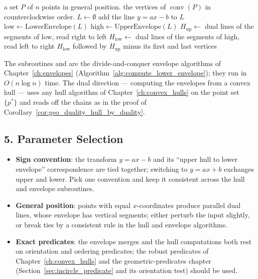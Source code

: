 \begin{algorithm}[htbp]
\caption{Convex Hull via Dual Envelopes}
\label{alg:geo_duality_hull_by_envelopes}
\begin{algorithmic}[1]
\Require a set $P$ of $n$ points in general position.
\Ensure the vertices of $\operatorname{conv}(P)$ in counterclockwise order.
  \State $L \gets \emptyset$
    \State add the line $y = ax - b$ to $L$ 
  \EndFor
  \State $\text{low} \gets \text{LowerEnvelope}(L)$ 
  \State $\text{high} \gets \text{UpperEnvelope}(L)$ 
  \State $H_{\text{up}} \gets $ dual lines of the segments of $\text{low}$,
         read right to left 
  \State $H_{\text{low}} \gets $ dual lines of the segments of $\text{high}$,
         read left to right 
  \State \Return $H_{\text{low}}$ followed by $H_{\text{up}}$ minus its
         first and last vertices
\EndFunction
\end{algorithmic}
\end{algorithm}

The subroutines  and  are the
divide-and-conquer envelope algorithms of Chapter~\ref{ch:envelopes}
(Algorithm~\ref{alg:compute_lower_envelope}); they run in $O(n \log n)$
time. The dual direction --- computing the envelopes from a convex hull ---
uses any hull algorithm of Chapter~\ref{ch:convex_hulls} on the point set
$\{p^*\}$ and reads off the chains as in the proof of
Corollary~\ref{cor:geo_duality_hull_by_duality}.

\subsection{5. Parameter Selection}

\begin{itemize}
\item \textbf{Sign convention}: the transform $y = ax - b$ and its ``upper
  hull to lower envelope'' correspondence are tied together; switching to
  $y = ax + b$ exchanges upper and lower. Pick one convention and keep it
  consistent across the hull and envelope subroutines.
\item \textbf{General position}: points with equal $x$-coordinates produce
  parallel dual lines, whose envelope has vertical segments; either perturb
  the input slightly, or break ties by a consistent rule in the hull and
  envelope algorithms.
\item \textbf{Exact predicates}: the envelope merges and the hull computations
  both rest on orientation and ordering predicates; the robust predicates of
  Chapter~\ref{ch:convex_hulls} and the geometric-predicates chapter
  (Section~\ref{sec:incircle_predicate} and its orientation test) should be
  used.
\end{itemize}

